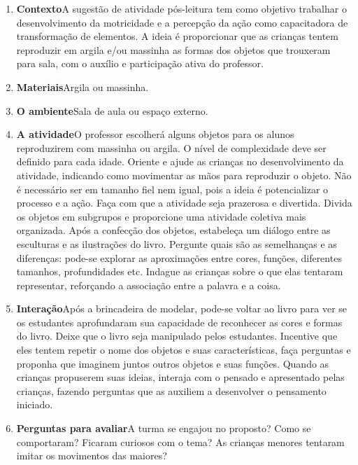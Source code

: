\documentclass[11pt]{extarticle}
\begin{document}
\begin{enumerate}
\item \textbf{Contexto}\quad A sugestão de atividade pós-leitura tem como objetivo trabalhar o desenvolvimento da motricidade e a percepção da ação como capacitadora de transformação de elementos. A ideia é proporcionar que as crianças tentem reproduzir em argila e/ou massinha as formas dos objetos que trouxeram para sala, com o auxílio e participação ativa do professor.


\item \textbf{Materiais}\quad Argila ou massinha.

\item \textbf{O ambiente}\quad Sala de aula ou espaço externo.

\item \textbf{A atividade}\quad O professor escolherá alguns objetos para os alunos reproduzirem com massinha ou argila. O nível de complexidade deve ser definido para cada idade. Oriente e ajude as crianças no desenvolvimento da atividade, indicando como movimentar as mãos para reproduzir o objeto. Não é necessário ser em tamanho fiel nem igual, pois a ideia é potencializar o processo e a ação. Faça com que a atividade seja prazerosa e divertida. Divida os objetos em subgrupos e proporcione uma atividade coletiva mais organizada. Após a confecção dos objetos, estabeleça um diálogo entre as esculturas e as ilustrações do livro. Pergunte quais são as semelhanças e as diferenças: pode-se explorar as aproximações entre cores, funções, diferentes tamanhos, profundidades etc. Indague as crianças sobre o que elas tentaram representar, reforçando a associação entre a palavra e a coisa.


\item \textbf{Interação}\quad Após a brincadeira de modelar, pode-se voltar ao livro para ver se os estudantes aprofundaram sua capacidade de reconhecer as cores e formas do livro.
Deixe que o livro seja manipulado pelos estudantes. Incentive que eles tentem repetir o nome dos objetos e suas características,
faça perguntas e proponha que imaginem juntos outros objetos e suas funções.
Quando as crianças propuserem suas ideias, interaja com o pensado e apresentado pelas crianças, fazendo perguntas que as auxiliem a desenvolver o pensamento iniciado.

\item \textbf{Perguntas para avaliar}\quad A turma se engajou no proposto? Como se comportaram? Ficaram curiosos com o tema? As crianças menores tentaram imitar os movimentos das maiores? 
\end{enumerate}
\end{document}
